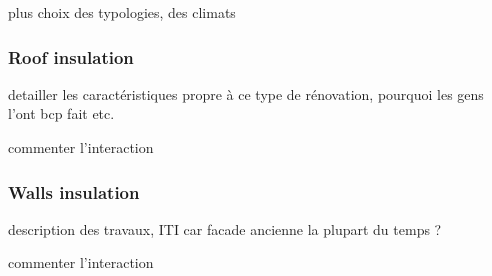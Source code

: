 \documentclass[11pt]{article}
\begin{document}
    plus choix des typologies, des climats

        \subsubsection{Roof insulation} %
        \label{ssub:roof_insulation}
        
        detailler les caractéristiques propre à ce type de rénovation, pourquoi les gens l'ont bcp fait etc. 

        commenter l'interaction

        \subsubsection{Walls insulation} %
        \label{ssub:walls_insulation}

        description des travaux, ITI car facade ancienne la plupart du temps ? 

        commenter l'interaction
\end{document}
